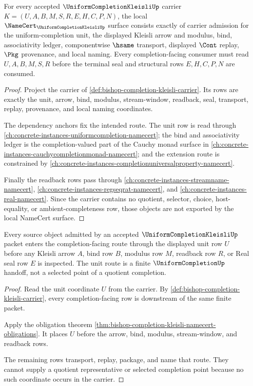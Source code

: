 \begin{theorem}
\label{thm:bishop-completion-kleisli-namecert-obligations}
For every accepted $\UniformCompletionKleisliUp$ carrier $K=(U,A,B,M,S,R,E,H,C,P,N)$, the local $\NameCert_{\UniformCompletionKleisliUp}$ surface consists exactly of carrier admission for the uniform-completion unit, the displayed Kleisli arrow and modulus, bind, associativity ledger, componentwise $\hsame$ transport, displayed $\Cont$ replay, $\Pkg$ provenance, and local naming. Every completion-facing consumer must read $U,A,B,M,S,R$ before the terminal seal and structural rows $E,H,C,P,N$ are consumed.
\end{theorem}
\begin{proof}
Project the carrier of \autoref{def:bishop-completion-kleisli-carrier}. Its rows are exactly the unit, arrow, bind, modulus, stream-window, readback, seal, transport, replay, provenance, and local naming coordinates.

The dependency anchors fix the intended route. The unit row is read through \autoref{ch:concrete-instances-uniformcompletion-namecert}; the bind and associativity ledger is the completion-valued part of the Cauchy monad surface in \autoref{ch:concrete-instances-cauchycompletionmonad-namecert}; and the extension route is constrained by \autoref{ch:concrete-instances-completionuniversalproperty-namecert}.

Finally the readback rows pass through \autoref{ch:concrete-instances-streamname-namecert}, \autoref{ch:concrete-instances-regseqrat-namecert}, and \autoref{ch:concrete-instances-real-namecert}. Since the carrier contains no quotient, selector, choice, host-equality, or ambient-completeness row, those objects are not exported by the local NameCert surface.
\end{proof}

\begin{theorem}
\label{thm:bishop-completion-kleisli-unit-route}
Every source object admitted by an accepted $\UniformCompletionKleisliUp$ packet enters the completion-facing route through the displayed unit row $U$ before any Kleisli arrow $A$, bind row $B$, modulus row $M$, readback row $R$, or Real seal row $E$ is inspected. The unit route is a finite $\UniformCompletionUp$ handoff, not a selected point of a quotient completion.
\end{theorem}
\begin{proof}
Read the unit coordinate $U$ from the carrier. By \autoref{def:bishop-completion-kleisli-carrier}, every completion-facing row is downstream of the same finite packet.

Apply the obligation theorem \autoref{thm:bishop-completion-kleisli-namecert-obligations}. It places $U$ before the arrow, bind, modulus, stream-window, and readback rows.

The remaining rows transport, replay, package, and name that route. They cannot supply a quotient representative or selected completion point because no such coordinate occurs in the carrier.
\end{proof}


